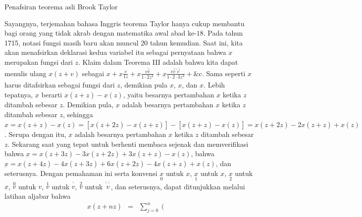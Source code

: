 \begin{digression}{Penafsiran teorema asli Brook Taylor} 

\noindent Sayangnya, terjemahan bahasa Inggris teorema Taylor hanya
cukup membantu bagi orang yang tidak akrab dengan matematika awal
abad ke-$18$. Pada tahun 1715, notasi fungsi masih baru akan muncul
20 tahun kemudian. Saat ini, kita akan menafsirkan deklarasi kedua
variabel itu sebagai pernyataan bahwa $x$ merupakan fungsi dari $z$.
Klaim dalam Teorema III adalah bahwa kita dapat menulis ulang $x(z+v)$
sebagai $x+\underset{\dot{\ }}{x}\frac{v}{1\underset{\dot{\ }}{z}}+\underset{\ddot{\ }}{x}\frac{v\overset{\backslash}{v}}{1\cdot2\underset{\dot{\ }}{z}^{2}}+\underset{\dddot{\ }}{x}\frac{v\overset{\backslash}{v}\overset{\backslash\backslash}{v}}{1\cdot2\cdot3\underset{\dot{\ }}{z}^{3}}+\mbox{\&c}$.
Sama seperti $x$ harus ditafsirkan sebagai fungsi dari $z$, demikian
pula $\underset{\dot{\ }}{x}$, $\underset{\ddot{\ }}{x}$, dan $\underset{\dddot{\ }}{x}$.
Lebih tepatnya, $\underset{\dot{\ }}{x}$ berarti $x(z+\underset{\dot{\ }}{z})-x(z)$,
yaitu besarnya pertambahan $x$ ketika $z$ ditambah sebesar $\underset{\dot{\ }}{z}$.
Demikian pula, $\underset{\ddot{\ }}{x}$ adalah besarnya pertambahan
$\underset{\dot{\ }}{x}$ ketika $z$ ditambah sebesar $\underset{\dot{\ }}{z}$,
sehingga $\underset{\ddot{\ }}{x}=\underset{\dot{\ }}{x}(z+\underset{\dot{\ }}{z})-\underset{\dot{\ }}{x}(z)=\left[x(z+2\underset{\dot{\ }}{z})-x(z+\underset{\dot{\ }}{z})\right]-\left[x(z+\underset{\dot{\ }}{z})-x(z)\right]=x(z+2\underset{\dot{\ }}{z})-2x(z+\underset{\dot{\ }}{z})+x(z)$.
Serupa dengan itu, $\underset{\dddot{\ }}{x}$ adalah besarnya pertambahan
$\underset{\ddot{\ }}{x}$ ketika $z$ ditambah sebesar $\underset{\dot{\ }}{z}$.
Sekarang saat yang tepat untuk berhenti membaca sejenak dan memverifikasi
bahwa $\underset{\dddot{\ }}{x}=x(z+3\underset{\dot{\ }}{z})-3x(z+2\underset{\dot{\ }}{z})+3x(z+\underset{\dot{\ }}{z})-x(z)$,
bahwa $\underset{\ddddot{\ }}{x}=x(z+4\underset{\dot{\ }}{z})-4x(z+3\underset{\dot{\ }}{z})+6x(z+2\underset{\dot{\ }}{z})-4x(z+\underset{\dot{\ }}{z})+x(z)$,
dan seterusnya. Dengan pemahaman ini serta konvensi $\underset{0}{x}$
untuk $x$, $\underset{1}{x}$ untuk $\underset{\dot{\ }}{x}$, $\underset{2}{x}$
untuk $\underset{\ddot{\ }}{x}$, $\overset{0}{v}$ untuk $v$, $\overset{1}{v}$
untuk $\overset{^{\backslash}}{v}$, $\overset{2}{v}$ untuk $\overset{^{\backslash\backslash}}{v}$,
dan seterusnya, dapat ditunjukkan melalui latihan aljabar bahwa
\begin{eqnarray*}
x(z+n\underset{\dot{\ }}{z}) & = & \sum_{j=0}^{n}\left(\begin{array}{c}

\end{array}
\end{eqnarray*}
\end{digression}
